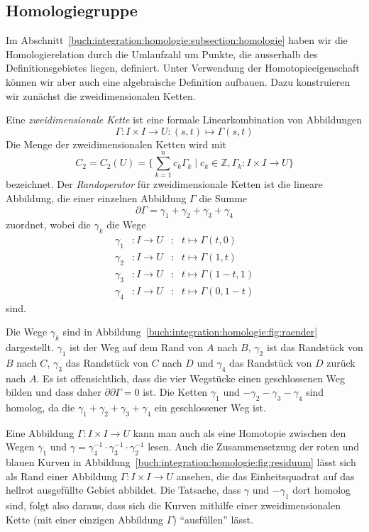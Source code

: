 %
%
%
\subsection{Homologiegruppe}
Im Abschnitt~\ref{buch:integration:homologie:subsection:homologie}
haben wir die Homologierelation durch die Umlaufzahl um Punkte,
die ausserhalb des Definitionsgebietes liegen, definiert.
%
Unter Verwendung der Homotopieeigenschaft können wir aber auch eine
algebraische Definition aufbauen.
Dazu konstruieren wir zunächst die zweidimensionalen Ketten.

\begin{definition}
Eine \emph{zweidimensionale Kette} ist eine formale Linearkombination
von Abbildungen 
\[
\Gamma
\colon
I\times I \to U
:
(s,t) \mapsto \Gamma(s,t)
\]
Die Menge der zweidimensionalen Ketten wird mit
\[
C_2
=
C_2(U)
=
\biggl\{
\sum_{k=1}^n c_k\Gamma_k
\;
\bigg|
\;
c_k\in\mathbb{Z}, \Gamma_k\colon I\times I\to U
\biggr\}
\]
bezeichnet.
Der \emph{Randoperator} für zweidimensionale Ketten ist die lineare
Abbildung, die einer einzelnen Abbildung $\Gamma$ die Summe
\[
\partial \Gamma
=
\gamma_1
+
\gamma_2
+
\gamma_3
+
\gamma_4
\]
zuordnet, wobei die $\gamma_k$ die Wege
\[
\renewcommand{\arraycolsep}{2pt}
\begin{array}{rlcl}
\gamma_1 &\colon I \to U&:&t\mapsto \Gamma(t,0)\\
\gamma_2 &\colon I \to U&:&t\mapsto \Gamma(1,t)\\
\gamma_3 &\colon I \to U&:&t\mapsto \Gamma(1-t,1)\\
\gamma_4 &\colon I \to U&:&t\mapsto \Gamma(0,1-t)
\end{array}
\]
sind.
\end{definition}

Die Wege $\gamma_k$ sind in
Abbildung~\ref{buch:integration:homologie:fig:raender} dargestellt.
$\gamma_1$ ist der Weg auf dem Rand von $A$ nach $B$,
$\gamma_2$ ist das Randstück von $B$ nach $C$,
$\gamma_3$ das Randstück von $C$ nach $D$ und
$\gamma_4$ das Randstück von $D$ zurück nach $A$.
Es ist offensichtlich, dass die vier Wegstücke einen geschlossenen
Weg bilden und dass daher $\partial\partial \Gamma=0$ ist.
Die Ketten $\gamma_1$ und $-\gamma_2-\gamma_3-\gamma_4$ sind homolog,
da die $\gamma_1+\gamma_2+\gamma_3+\gamma_4$ ein geschlossener
Weg ist.

Eine Abbildung $\Gamma\colon I\times I\to U$ kann man auch als
eine Homotopie zwischen den Wegen $\gamma_1$ und $\gamma
=
\gamma_4^{-1}\cdot\gamma_3^{-1}\cdot\gamma_2^{-1}$ lesen.
Auch die Zusammensetzung der roten und blauen Kurven in 
Abbildung~\ref{buch:integration:homologie:fig:residuum}
lässt sich als Rand einer Abbildung $\Gamma\colon I\times I\to U$
ansehen, die das Einheitsquadrat auf das hellrot ausgefüllte Gebiet
abbildet.
Die Tatsache, dass $\gamma$ und $-\gamma_1$ dort homolog sind, folgt
also daraus, dass sich die Kurven mithilfe einer zweidimensionalen
Kette (mit einer einzigen Abbildung $\Gamma$) ``ausfüllen'' lässt.

